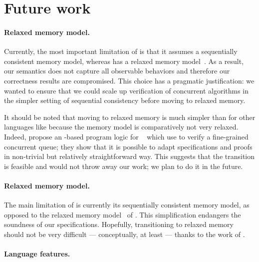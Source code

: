 \section{Future work}

\paragraph{Relaxed memory model.}

Currently, the most important limitation of \ZooLang is that it assumes a sequentially consistent memory model, whereas \OCamlFive has a relaxed memory model~\citep*{DBLP:conf/pldi/DolanSM18}.
As a result, our semantics does not capture all observable behaviors and therefore our correctness results are compromised.
This choice has a pragmatic justification: we wanted to ensure that we could scale up verification of concurrent algorithms in the simpler setting of sequential consistency before moving to relaxed memory.

It should be noted that moving to relaxed memory is much simpler than for other languages like \C because the \OCamlFive memory model is comparatively not very relaxed.
Indeed, \citet*{DBLP:journals/pacmpl/MevelJP20} propose an \Iris-based program logic for \MulticoreOCaml~\citep*{DBLP:journals/pacmpl/Sivaramakrishnan20} which \citet*{DBLP:journals/pacmpl/MevelJ21} use to verify a fine-grained concurrent queue; they show that it is possible to adapt specifications and proofs in non-trivial but relatively straightforward way.
This suggests that the transition is feasible and would not throw away our work; we plan to do it in the future.

\paragraph{Relaxed memory model.}

The main limitation of \ZooLang is currently its sequentially consistent memory model, as opposed to the relaxed memory model~\citep*{DBLP:conf/pldi/DolanSM18} of \OCamlFive.
This simplification endangers the soundness of our specifications.
Hopefully, transitioning \Zoo to relaxed memory should not be very difficult --- conceptually, at least --- thanks to the work of \citet*{DBLP:journals/pacmpl/MevelJP20}.

\paragraph{Language features.}

